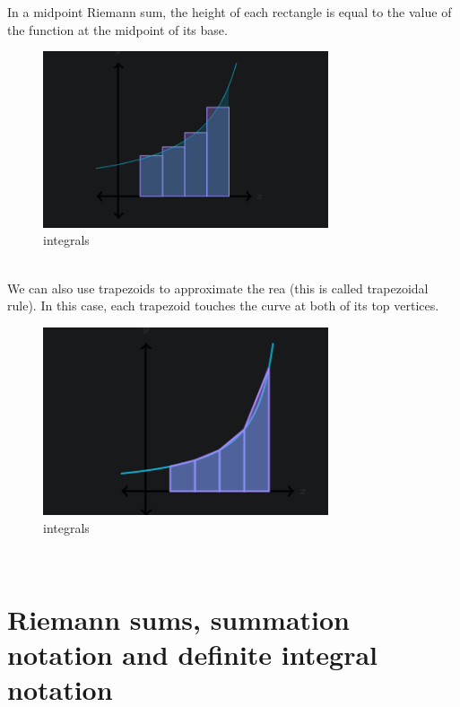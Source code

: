 \documentclass{article}
\begin{document}
            In a midpoint Riemann sum, the height of each rectangle is equal to the value of the function at the midpoint of its base.\\
            \begin{figure}[ht]
                \centering
                \includegraphics[bb=0 0 355 244, width=0.75\textwidth]{images/mid_riem.png}
                \caption{integrals}\label{fig:midpoint Reimann}
            \end{figure} \\
            We can also use trapezoids to approximate the rea (this is called trapezoidal rule). In this case, each trapezoid touches the curve at both of its top vertices.\\
            \begin{figure}[ht]
                \centering
                \includegraphics[bb=0 0 355 244, width=0.75\textwidth]{images/trap_rule.png}
                \caption{integrals}\label{fig:trapezoid rule}
            \end{figure} \\
        \section{Riemann sums, summation notation and definite integral notation}
\end{document}
